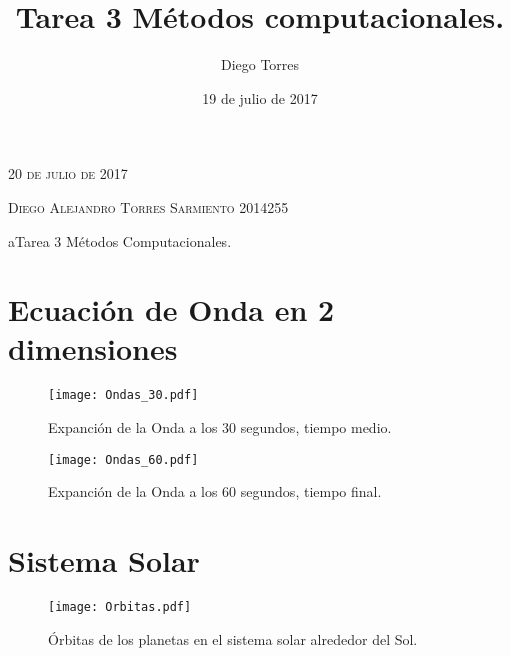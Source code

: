 \documentclass{article}
\author{Diego Torres}
\date{19 de julio de 2017}
\title{Tarea 3 Métodos computacionales.}
\newcommand{\JournalIssue}[1]{%
		\hfill \textsc{20 de julio de 2017}
		\par \normalsize \normalfont}
\newcommand{\JournalName}[1]{%
		\begin{center}	
			\Huge \usefont{T1}{m}{n}
			#1%
		\end{center}	
		\par \normalsize \normalfont}
\newcommand{\NewsAuthor}[1]{%
  \hfill \textsc{Diego Alejandro Torres Sarmiento 2014255}
  \par \normalsize \normalfont}
\begin{document}
\JournalIssue{1}
\NewsAuthor{}
\JournalName{aTarea 3 Métodos Computacionales.}

\section{Ecuación de Onda en 2 dimensiones}

\begin{figure}[h!]
\centering
\texttt{[image: Ondas\_30.pdf]}
\caption{Expanción de la Onda a los 30 segundos, tiempo medio.}
\end{figure}

\begin{figure}[h!]
\centering
\texttt{[image: Ondas\_60.pdf]}
\caption{Expanción de la Onda a los 60 segundos, tiempo final.}
\end{figure}

\section{Sistema Solar}

\begin{figure}[h!]
\centering
\texttt{[image: Orbitas.pdf]}
\caption{Órbitas de los planetas en el sistema solar alrededor del Sol.}
\end{figure}
\end{document}
